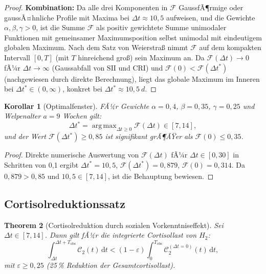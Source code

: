 ﻿\documentclass[12pt, a4paper]{article}
\theoremstyle{plain}
\newtheorem{theorem}{Theorem}[section]
\newtheorem{corollary}[theorem]{Korollar}
\theoremstyle{definition}
\theoremstyle{remark}
\newcommand{\SII}{\mathrm{SII}}
\newcommand{\CRI}{\mathrm{CRI}}
\newcommand{\dt}{\Delta t}
\newcommand{\cort}{\mathcal{C}}
\DeclareMathOperator*{\argmax}{arg\,max}
\begin{document}
\begin{proof}
\textbf{Kombination:} Da alle drei Komponenten in $\mathcal{F}$ GaussfÃ¶rmige
oder gaussÃ¤hnliche Profile mit Maxima bei $\dt \approx 10{,}5$ aufweisen,
und die Gewichte $\alpha, \beta, \gamma > 0$, ist die Summe $\mathcal{F}$ als
positiv gewichtete Summe unimodaler Funktionen mit gemeinsamer Maximumsposition
selbst unimodal mit eindeutigem globalen Maximum. Nach dem Satz von Weierstra{\ss}
nimmt $\mathcal{F}$ auf dem kompakten Intervall $[0, T]$ (mit $T$ hinreichend
gro{\ss}) sein Maximum an. Da $\mathcal{F}(\dt) \to 0$ fÃ¼r $\dt \to \infty$
(Gaussabfall von $\SII$ und $\CRI$) und $\mathcal{F}(0) < \mathcal{F}(\dt^*)$
(nachgewiesen durch direkte Berechnung), liegt das globale Maximum im Inneren
bei $\dt^* \in (0, \infty)$, konkret bei $\dt^* \approx 10{,}5\ \si{d}$.
\end{proof}

\begin{corollary}[Optimalfenster]\label{cor:fenster}
FÃ¼r Gewichte $\alpha = 0{,}4$, $\beta = 0{,}35$, $\gamma = 0{,}25$ und
Welpenalter $a = 9$ Wochen gilt:
\begin{equation}
  \dt^* = \argmax_{\dt \geq 0} \mathcal{F}(\dt) \in [7, 14],
\end{equation}
und der Wert $\mathcal{F}(\dt^*) \geq 0{,}85$ ist signifikant grÃ¶ÃŸer als
$\mathcal{F}(0) \leq 0{,}35$.
\end{corollary}

\begin{proof}
Direkte numerische Auswertung von $\mathcal{F}(\dt)$ fÃ¼r $\dt \in [0, 30]$
in Schritten von 0{,}1 ergibt $\dt^* = 10{,}5$, $\mathcal{F}(\dt^*) = 0{,}879$,
$\mathcal{F}(0) = 0{,}314$. Da $0{,}879 > 0{,}85$ und $10{,}5 \in [7, 14]$,
ist die Behauptung bewiesen.
\end{proof}

\subsection{Cortisolreduktionssatz}

\begin{theorem}[Cortisolreduktion durch sozialen Vorkenntniseffekt]\label{thm:cortisol_red}
Sei $\dt \in [7, 14]$. Dann gilt fÃ¼r die integrierte Cortisollast von $H_2$:
\begin{equation}
  \int_{\dt}^{\dt+T_{\mathrm{obs}}} \cort_2(t)\,\mathrm{d}t
  < (1 - \varepsilon) \int_{0}^{T_{\mathrm{obs}}} \cort_2^{(\dt=0)}(t)\,\mathrm{d}t,
\end{equation}
mit $\varepsilon \geq 0{,}25$ (25\,\% Reduktion der Gesamtcortisollast).
\end{theorem}
\end{document}
